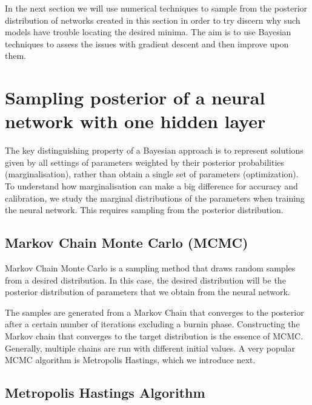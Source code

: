\documentclass[review]{siamart190516}
\begin{document}
\newline 
In the next section we will use numerical techniques to sample from the posterior distribution of networks created in this section in order to try discern why such models have trouble locating the desired minima. The aim is to use Bayesian techniques to assess the issues with gradient descent and then improve upon them.

\section{Sampling posterior of a neural network with one hidden layer}

The key distinguishing property of a Bayesian approach is to represent solutions given by all settings of parameters weighted by their posterior probabilities (marginalisation), rather than obtain a single set of parameters (optimization). To understand how marginalisation can make a big difference for accuracy and calibration, we study the marginal distributions of the parameters when training the neural network. This requires sampling from the posterior distribution.

\subsection{Markov Chain Monte Carlo (MCMC)} \label{sec:mcmc}

Markov Chain Monte Carlo is a sampling method that draws random samples from a desired distribution. In this case, the desired distribution will be the posterior distribution of parameters that we obtain from the neural network.

The samples are generated from a Markov Chain that converges to the posterior after a certain number of iterations excluding a burnin phase. Constructing the Markov chain that converges to the target distribution is the essence of MCMC. Generally, multiple chains are run with different initial values. A very popular MCMC algorithm is Metropolis Hastings, which we introduce next.

\subsection{Metropolis Hastings Algorithm} \label{sec:metro_hast}
\end{document}
